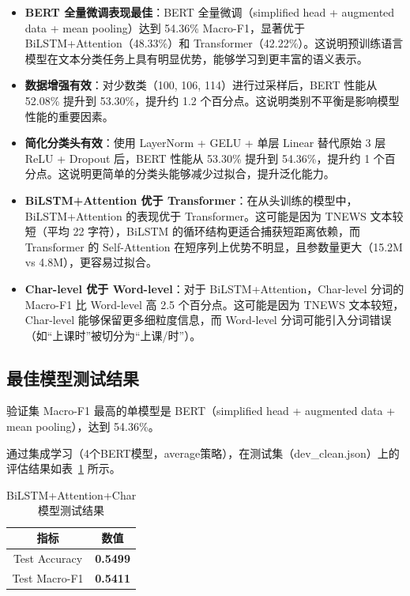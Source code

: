 \documentclass[a4paper]{article}
\begin{document}
\begin{itemize}
    \item \textbf{BERT 全量微调表现最佳}：BERT 全量微调（simplified head + augmented data + mean pooling）达到 54.36\% Macro-F1，显著优于 BiLSTM+Attention（48.33\%）和 Transformer（42.22\%）。这说明预训练语言模型在文本分类任务上具有明显优势，能够学习到更丰富的语义表示。
    \item \textbf{数据增强有效}：对少数类（100, 106, 114）进行过采样后，BERT 性能从 52.08\% 提升到 53.30\%，提升约 1.2 个百分点。这说明类别不平衡是影响模型性能的重要因素。
    \item \textbf{简化分类头有效}：使用 LayerNorm + GELU + 单层 Linear 替代原始 3 层 ReLU + Dropout 后，BERT 性能从 53.30\% 提升到 54.36\%，提升约 1 个百分点。这说明更简单的分类头能够减少过拟合，提升泛化能力。
    \item \textbf{BiLSTM+Attention 优于 Transformer}：在从头训练的模型中，BiLSTM+Attention 的表现优于 Transformer。这可能是因为 TNEWS 文本较短（平均 22 字符），BiLSTM 的循环结构更适合捕获短距离依赖，而 Transformer 的 Self-Attention 在短序列上优势不明显，且参数量更大（15.2M vs 4.8M），更容易过拟合。
    \item \textbf{Char-level 优于 Word-level}：对于 BiLSTM+Attention，Char-level 分词的 Macro-F1 比 Word-level 高 2.5 个百分点。这可能是因为 TNEWS 文本较短，Char-level 能够保留更多细粒度信息，而 Word-level 分词可能引入分词错误（如“上课时”被切分为“上课/时”）。
\end{itemize}

\subsection{最佳模型测试结果}

验证集 Macro-F1 最高的单模型是 BERT（simplified head + augmented data + mean pooling），达到 54.36\%。

通过集成学习（4个BERT模型，average策略），在测试集（dev\_clean.json）上的评估结果如表~\ref{tab:test} 所示。

\begin{table}[H]
    \centering
    \small
    \begin{tabular}{|c|c|}
        \hline
        \textbf{指标} & \textbf{数值} \\
        \hline
        Test Accuracy & \textbf{0.5499} \\
        Test Macro-F1 & \textbf{0.5411} \\
        \hline
    \end{tabular}
    \caption{BiLSTM+Attention+Char 模型测试结果}
    \label{tab:test}
\end{table}
\end{document}
